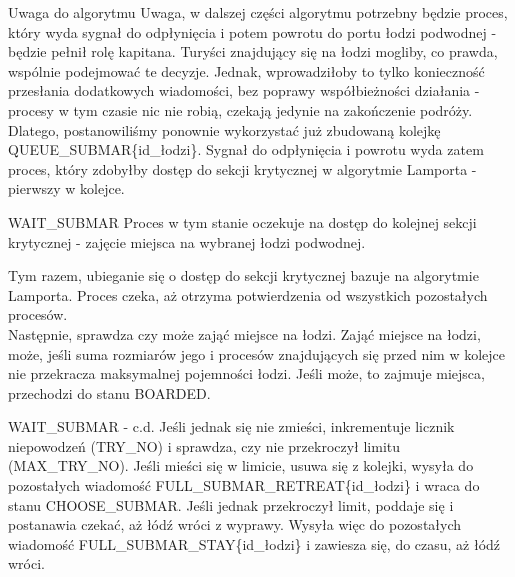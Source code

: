 \documentclass{beamer}
\begin{document}
\begin{frame}{Uwaga do algorytmu}
    \internallinenumbers
    Uwaga, w dalszej części algorytmu potrzebny będzie proces, który wyda sygnał do odpłynięcia i potem powrotu do portu łodzi podwodnej - będzie pełnił rolę kapitana. Turyści znajdujący się na łodzi mogliby, co prawda, wspólnie podejmować te decyzje. Jednak, wprowadziłoby to tylko konieczność przesłania dodatkowych wiadomości, bez poprawy współbieżności działania - procesy w tym czasie nic nie robią, czekają jedynie na zakończenie podróży. Dlatego, postanowiliśmy ponownie wykorzystać już zbudowaną kolejkę QUEUE\_SUBMAR\{id\_łodzi\}. Sygnał do odpłynięcia i powrotu wyda zatem proces, który zdobyłby dostęp do sekcji krytycznej w algorytmie Lamporta - pierwszy w kolejce.
\end{frame}

\begin{frame}{WAIT\_SUBMAR}
    \internallinenumbers
    \resetlinenumber[1]
    Proces w tym stanie oczekuje na dostęp do kolejnej sekcji krytycznej - zajęcie miejsca na wybranej łodzi podwodnej.

    \vspace{0.4cm}
    Tym razem, ubieganie się o dostęp do sekcji krytycznej bazuje na algorytmie Lamporta. Proces czeka, aż otrzyma potwierdzenia od wszystkich pozostałych procesów. \\
    Następnie, sprawdza czy może zająć miejsce na łodzi. Zająć miejsce na łodzi, może, jeśli suma rozmiarów jego i procesów znajdujących się przed nim w kolejce nie przekracza maksymalnej pojemności łodzi. Jeśli może, to zajmuje miejsca, przechodzi do stanu BOARDED.
\end{frame}

\begin{frame}{WAIT\_SUBMAR - c.d.}
    \internallinenumbers
    Jeśli jednak się nie zmieści, inkrementuje licznik niepowodzeń (TRY\_NO) i sprawdza, czy nie przekroczył limitu (MAX\_TRY\_NO). Jeśli mieści się w limicie, usuwa się z kolejki, wysyła do pozostałych wiadomość FULL\_SUBMAR\_RETREAT\{id\_łodzi\} i wraca do stanu CHOOSE\_SUBMAR. Jeśli jednak przekroczył limit, poddaje się i postanawia czekać, aż łódź wróci z wyprawy. Wysyła więc do pozostałych wiadomość FULL\_SUBMAR\_STAY\{id\_łodzi\} i zawiesza się, do czasu, aż łódź wróci.
\end{frame}
\end{document}
